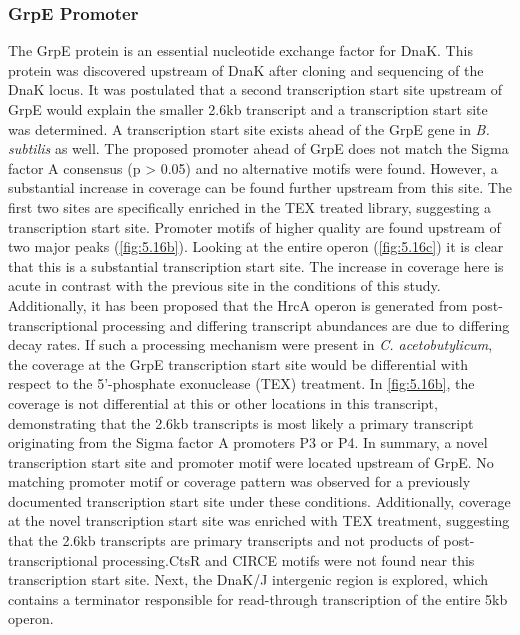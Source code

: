 \subsubsection{GrpE Promoter}
The GrpE protein is an essential nucleotide exchange factor for DnaK. This protein was discovered upstream of DnaK after cloning and sequencing of the DnaK locus\cite{80}. It was postulated that a second transcription start site upstream of GrpE would explain the smaller 2.6kb transcript and a transcription start site was determined\cite{80}. A transcription start site exists ahead of the GrpE gene in \textit{B. subtilis} as well\cite{81}. The proposed promoter ahead of GrpE does not match the Sigma factor A consensus (p > 0.05) and no alternative motifs were found. However, a substantial increase in coverage can be found further upstream from this site. The first two sites are specifically enriched in the TEX treated library, suggesting a transcription start site. Promoter motifs of higher quality are found upstream of two major peaks (\ref{fig:5.16b}). Looking at the entire operon (\ref{fig:5.16c}) it is clear that this is a substantial transcription start site. The increase in coverage here is acute in contrast with the previous site in the conditions of this study. Additionally, it has been proposed that the HrcA operon is generated from post-transcriptional processing and differing transcript abundances are due to differing decay rates\cite{81}. If such a processing mechanism were present in \textit{C. acetobutylicum}, the coverage at the GrpE transcription start site would be differential with respect to the 5'-phosphate exonuclease (TEX) treatment. In \ref{fig:5.16b}, the coverage is not differential at this or other locations in this transcript, demonstrating that the 2.6kb transcripts is most likely a primary transcript originating from the Sigma factor A promoters P3 or P4. In summary, a novel transcription start site and promoter motif were located upstream of GrpE. No matching promoter motif or coverage pattern was observed for a previously documented transcription start site under these conditions. Additionally, coverage at the novel transcription start site was enriched with TEX treatment, suggesting that the 2.6kb transcripts are primary transcripts and not products of post-transcriptional processing.CtsR and CIRCE motifs were not found near this transcription start site. Next, the DnaK/J intergenic region is explored, which contains a terminator responsible for read-through transcription of the entire 5kb operon.

